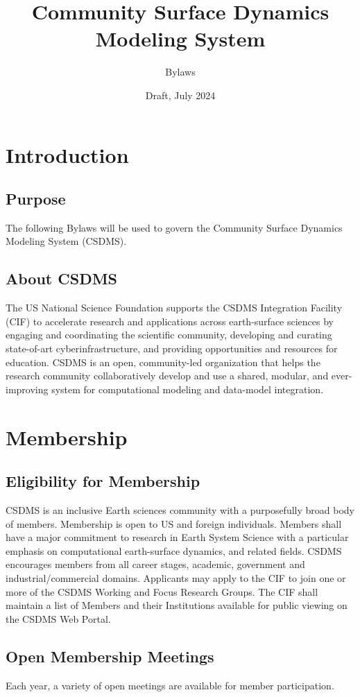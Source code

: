 \documentclass[11pt, oneside]{article}   	%
\title{Community Surface Dynamics Modeling System}
\author{Bylaws}
\date{Draft, July 2024}							%
\def\article#1{
\renewcommand{\thesection}{Article \Roman{section}} 
\section[Article]{#1}
\renewcommand{\thesection}{\Roman{section}} 
}
\begin{document}
\maketitle



\article{Introduction}

\subsection{Purpose}

The following Bylaws will be used to govern the Community Surface Dynamics Modeling System (CSDMS). 

\subsection{About CSDMS}

The US National Science Foundation supports the CSDMS Integration Facility (CIF) to accelerate research and applications across earth-surface sciences by engaging and coordinating the scientific community, developing and curating state-of-art cyberinfrastructure, and providing opportunities and resources for education. CSDMS is an open, community-led organization that helps the research community collaboratively develop and use a shared, modular, and ever-improving system for computational modeling and data-model integration.



\article{Membership}


\subsection{Eligibility for Membership}

CSDMS is an inclusive Earth sciences community with a purposefully broad body of members. Membership is open to US and foreign individuals. Members shall have a major commitment to research in Earth System Science with a particular emphasis on computational earth-surface dynamics, and related fields. CSDMS encourages members from all career stages, academic, government and industrial/commercial domains. Applicants may apply to the CIF to join one or more of the CSDMS Working and Focus Research Groups. The CIF shall maintain a list of Members and their Institutions available for public viewing on the CSDMS Web Portal.


\subsection{Open Membership Meetings} Each year, a variety of open meetings are available for member participation.
\end{document}
